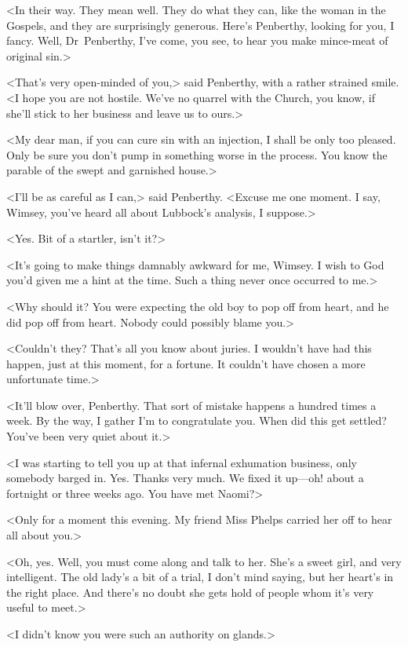 <In their way. They mean well. They do what they can, like the woman in the Gospels, and they are surprisingly generous. Here's Penberthy, looking for you, I fancy. Well, Dr~Penberthy, I've come, you see, to hear you make mince-meat of original sin.>

<That's very open-minded of you,> said Penberthy, with a rather strained smile. <I hope you are not hostile. We've no quarrel with the Church, you know, if she'll stick to her business and leave us to ours.>

<My dear man, if you can cure sin with an injection, I shall be only too pleased. Only be sure you don't pump in something worse in the process. You know the parable of the swept and garnished house.>

<I'll be as careful as I can,> said Penberthy. <Excuse me one moment. I say, Wimsey, you've heard all about Lubbock's analysis, I suppose.>

<Yes. Bit of a startler, isn't it?>

<It's going to make things damnably awkward for me, Wimsey. I wish to God you'd given me a hint at the time. Such a thing never once occurred to me.>

<Why should it? You were expecting the old boy to pop off from heart, and he did pop off from heart. Nobody could possibly blame you.>

<Couldn't they? That's all you know about juries. I wouldn't have had this happen, just at this moment, for a fortune. It couldn't have chosen a more unfortunate time.>

<It'll blow over, Penberthy. That sort of mistake happens a hundred times a week. By the way, I gather I'm to congratulate you. When did this get settled? You've been very quiet about it.>

<I was starting to tell you up at that infernal exhumation business, only somebody barged in. Yes. Thanks very much. We fixed it up—oh! about a fortnight or three weeks ago. You have met Naomi?>

<Only for a moment this evening. My friend Miss Phelps carried her off to hear all about you.>

<Oh, yes. Well, you must come along and talk to her. She's a sweet girl, and very intelligent. The old lady's a bit of a trial, I don't mind saying, but her heart's in the right place. And there's no doubt she gets hold of people whom it's very useful to meet.>

<I didn't know you were such an authority on glands.>

